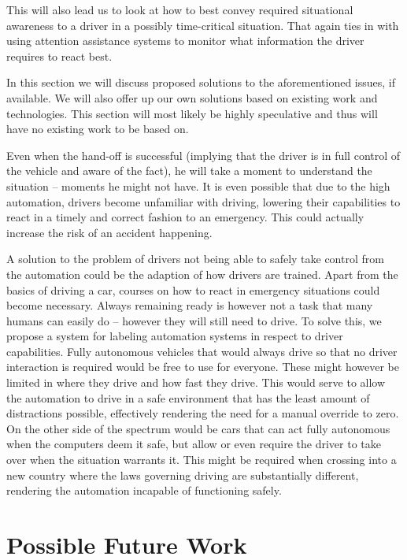 \documentclass{acm_proc_article-sp}
\begin{document}
This will also lead us to look at how to best convey required situational awareness to a driver in a possibly time-critical situation.
That again ties in with using attention assistance systems to monitor what information the driver requires to react best.

In this section we will discuss proposed solutions to the aforementioned issues, if available.
We will also offer up our own solutions based on existing work and technologies.
This section will most likely be highly speculative and thus will have no existing work to be based on.

Even when the hand-off is successful (implying that the driver is in full control of the vehicle and aware of the fact), he will take a moment to understand the situation – moments he might not have.
It is even possible that due to the high automation, drivers become unfamiliar with driving, lowering their capabilities to react in a timely and correct fashion to an emergency.
This could actually increase the risk of an accident happening.

A solution to the problem of drivers not being able to safely take control from the automation could be the adaption of how drivers are trained.
Apart from the basics of driving a car, courses on how to react in emergency situations could become necessary.
Always remaining ready is however not a task that many humans can easily do – however they will still need to drive.
To solve this, we propose a system for labeling automation systems in respect to driver capabilities.
Fully autonomous vehicles that would always drive so that no driver interaction is required would be free to use for everyone.
These might however be limited in where they drive and how fast they drive.
This would serve to allow the automation to drive in a safe environment that has the least amount of distractions possible, effectively rendering the need for a manual override to zero.
On the other side of the spectrum would be cars that can act fully autonomous when the computers deem it safe, but allow or even require the driver to take over when the situation warrants it.
This might be required when crossing into a new country where the laws governing driving are substantially different, rendering the automation incapable of functioning safely.

\section{Possible Future Work}
\end{document}
